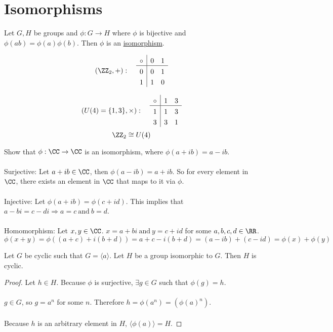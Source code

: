 \documentclass[class=scrartcl, crop=false]{standalone}
\begin{document}
\section{Isomorphisms}

\begin{definition}
  Let $G, H$ be groups and $\phi:G \to H$ where $\phi$ is bijective and $\phi(ab) = \phi(a)\phi(b)$. Then $\phi$ is an \ul{isomorphism}.
\end{definition}
\begin{example}
  \[
      (\ZZ_2, +): \quad
      \setlength{\extrarowheight}{3pt}%
      \begin{array}{l|*{5}{l}}
      \circ      & 0 & 1 \\
      \hline
      0           & 0 & 1 \\
      1           & 1 & 0 \\
      \end{array}
  \]
    
  \[
    (U(4) = \{1,3\}, \times): \quad
      \setlength{\extrarowheight}{3pt}%
      \begin{array}{l|*{5}{l}}
      \circ      & 1 & 3 \\
      \hline
      1           & 1 & 3 \\
      3           & 3 & 1 \\
      \end{array}
  \]
  \[
    \ZZ_2 \cong U(4)
  \]
\end{example}

\begin{example}
  Show that $\phi:\CC \to \CC$ is an isomorphism, where $\phi(a + ib) = a - ib$.
  \\\\
  Surjective: Let $a + ib \in \CC$, then $\phi(a - ib) = a + ib$. So for every element in $\CC$, there exists an element in $\CC$ that maps to it via $\phi$.
  \\\\
  Injective: Let $\phi(a + ib) = \phi(c + id)$. This implies that $a - bi = c - di \Rightarrow a = c \ \text{and} \ b = d$.
  \\\\
  Homomorphism: Let $x,y \in \CC$. $x = a + bi \ \text{and} \ y = c + id$ for some $a,b,c,d \in \RR$.
  \[
    \phi(x + y) = \phi((a + c) + i(b + d)) = a + c - i(b + d) = (a - ib) + (c - id) = \phi(x) + \phi(y)
  \]
\end{example}
\begin{theorem}
  Let $G$ be cyclic such that $G = \langle a \rangle $. Let $H$ be a group isomorphic to $G$. Then $H$ is cyclic.
  \begin{proof}
    Let $h \in H$. Because $\phi$ is surjective, $\exists g \in G$ such that $\phi(g) = h$.
    \\\\
    $g \in G$, so $g = a^n$ for some $n$. Therefore $h = \phi(a^n) = (\phi(a)^n)$.
    \\\\
    Because $h$ is an arbitrary element in $H$, $ \langle \phi(a) \rangle = H$.
  \end{proof}
\end{theorem}
\end{document}
